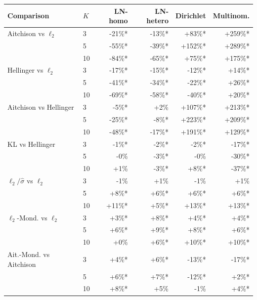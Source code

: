 \begin{tabular}{llrrrr}
\toprule
Comparison & $K$ & LN-homo & LN-hetero & Dirichlet & Multinom. \\
\midrule
Aitchison vs $\ell_2$ & 3 & -21\%* & -13\%* & +83\%* & +259\%* \\
 & 5 & -55\%* & -39\%* & +152\%* & +289\%* \\
 & 10 & -84\%* & -65\%* & +75\%* & +175\%* \\
\midrule
Hellinger vs $\ell_2$ & 3 & -17\%* & -15\%* & -12\%* & +14\%* \\
 & 5 & -41\%* & -34\%* & -22\%* & +26\%* \\
 & 10 & -69\%* & -58\%* & -40\%* & +20\%* \\
\midrule
Aitchison vs Hellinger & 3 & -5\%* & +2\% & +107\%* & +213\%* \\
 & 5 & -25\%* & -8\%* & +223\%* & +209\%* \\
 & 10 & -48\%* & -17\%* & +191\%* & +129\%* \\
\midrule
KL vs Hellinger & 3 & -1\%* & -2\%* & -2\%* & -17\%* \\
 & 5 & -0\% & -3\%* & -0\% & -30\%* \\
 & 10 & +1\% & -3\%* & +8\%* & -37\%* \\
\midrule
$\ell_2/\hat\sigma$ vs $\ell_2$ & 3 & -1\% & +1\% & -1\% & +1\% \\
 & 5 & +8\%* & +6\%* & +6\%* & +6\%* \\
 & 10 & +11\%* & +5\%* & +13\%* & +13\%* \\
\midrule
$\ell_2$-Mond. vs $\ell_2$ & 3 & +3\%* & +8\%* & +4\%* & +4\%* \\
 & 5 & +6\%* & +9\%* & +8\%* & +6\%* \\
 & 10 & +0\% & +6\%* & +10\%* & +10\%* \\
\midrule
Ait.-Mond. vs Aitchison & 3 & +4\%* & +6\%* & -13\%* & -17\%* \\
 & 5 & +6\%* & +7\%* & -12\%* & +2\%* \\
 & 10 & +8\%* & +5\% & -1\% & +4\%* \\
\bottomrule
\end{tabular}